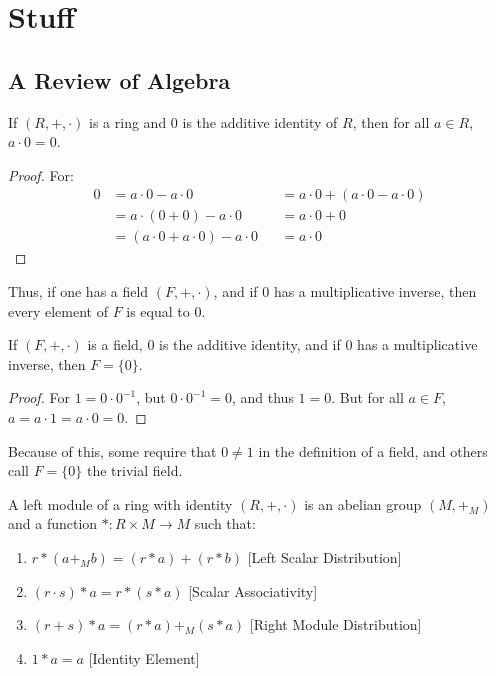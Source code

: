 \chapter{Stuff}
\section{A Review of Algebra}
    \begin{theorem}
        If $(R,+,\cdot)$ is a ring and $0$ is the additive
        identity of $R$, then for all $a\in{R}$,
        $a\cdot{0}=0$.
    \end{theorem}
    \begin{proof}
        For:
        \begin{align*}
            0&=a\cdot{0}-a\cdot{0}
            &
            &=a\cdot{0}+(a\cdot{0}-a\cdot{0})\\
            &=a\cdot(0+0)-a\cdot{0}
            &
            &=a\cdot{0}+0\\
            &=(a\cdot{0}+a\cdot{0})-a\cdot{0}
            &
            &=a\cdot{0}
        \end{align*}
    \end{proof}
    Thus, if one has a field $(F,+,\cdot)$, and if
    $0$ has a multiplicative inverse, then every element of
    $F$ is equal to $0$.
    \begin{theorem}
        If $(F,+,\cdot)$ is a field, $0$ is the additive
        identity, and if $0$ has a multiplicative inverse,
        then $F=\{0\}$.
    \end{theorem}
    \begin{proof}
        For $1=0\cdot{0}^{-1}$, but
        $0\cdot{0}^{-1}=0$, and thus $1=0$. But for all
        $a\in{F}$, $a=a\cdot{1}=a\cdot{0}=0$.
    \end{proof}
    Because of this, some require that $0\ne{1}$ in the
    definition of a field, and others call
    $F=\{0\}$ the trivial field.
    \begin{definition}
        A left module of a ring with identity $(R,+,\cdot)$
        is an abelian group $(M,+_{M})$ and a function
        $*:R\times{M}\rightarrow{M}$ such that:
        \begin{enumerate}
            \item $r*(a+_{M}b)=(r*a)+(r*b)$
                  \hfill[Left Scalar Distribution]
            \item $(r\cdot{s})*a=r*(s*a)$
                  \hfill[Scalar Associativity]
            \item $(r+s)*a=(r*a)+_{M}(s*a)$
                  \hfill[Right Module Distribution]
            \item $1*a=a$
                  \hfill[Identity Element]
        \end{enumerate}
    \end{definition}
